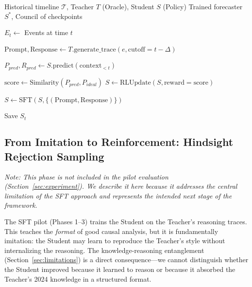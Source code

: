 \documentclass[11pt,a4paper]{article}
\begin{document}
\begin{algorithm}[ht]
\caption{Forecasting Pentagon Training --- Full Framework (Teacher-Oracle)}
\label{alg:pentagon}
\begin{algorithmic}[1]
\REQUIRE Historical timeline $\mathcal{T}$, Teacher $T$ (Oracle), Student $S$ (Policy)
\ENSURE Trained forecaster $S^*$, Council of checkpoints

    \STATE $E_t \leftarrow$ Events at time $t$

    \STATE {}
        \STATE $\text{Prompt}, \text{Response} \leftarrow T.\text{generate\_trace}(e, \text{cutoff}=t-\Delta)$
    \ENDFOR

    \STATE {}
        \STATE $P_{pred}, R_{pred} \leftarrow S.\text{predict}(\text{context}_{<t})$
    \ENDFOR

    \STATE {}
        \STATE $\text{score} \leftarrow \text{Similarity}(P_{pred}, P_{ideal})$
        \STATE $S \leftarrow \text{RLUpdate}(S, \text{reward}=\text{score})$
    \ENDFOR

    \STATE {}
    \STATE $S \leftarrow \text{SFT}(S, \{(\text{Prompt}, \text{Response})\})$

    \STATE {}
    \STATE Save $S_t$
\ENDFOR
\end{algorithmic}
\end{algorithm}

\subsection{From Imitation to Reinforcement: Hindsight Rejection Sampling}
\label{sec:rft}

\noindent\textit{Note: This phase is not included in the pilot evaluation (Section~\ref{sec:experiment}). We describe it here because it addresses the central limitation of the SFT approach and represents the intended next stage of the framework.}

The SFT pilot (Phases 1--3) trains the Student on the Teacher's reasoning traces. This teaches the \textit{format} of good causal analysis, but it is fundamentally imitation: the Student may learn to reproduce the Teacher's style without internalizing the reasoning. The knowledge-reasoning entanglement (Section~\ref{sec:limitations}) is a direct consequence---we cannot distinguish whether the Student improved because it learned to reason or because it absorbed the Teacher's 2024 knowledge in a structured format.
\end{document}
